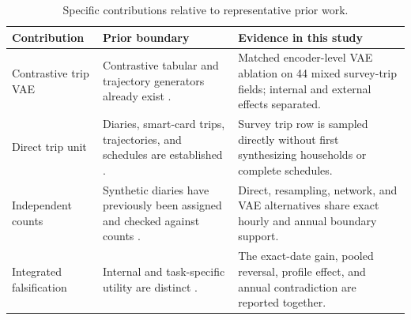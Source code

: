 \begin{table}[!htbp]
\caption{Specific contributions relative to representative prior work.}
\label{tab:contributions}
\centering
\setlength{\tabcolsep}{3.2pt}
\begin{tabularx}{\textwidth}{P{0.22\textwidth} P{0.34\textwidth}Y}
\toprule
\textbf{Contribution} & \textbf{Prior boundary} & \textbf{Evidence in this study} \\
\midrule
Contrastive trip VAE & Contrastive tabular and trajectory generators already exist \citep{lee2023codi,li2026syncmove}. & Matched encoder-level VAE ablation on 44 mixed survey-trip fields; internal and external effects separated. \\
Direct trip unit & Diaries, smart-card trips, trajectories, and schedules are established \citep{greaves2000survey,kieu2023smartcard,lee2025collagan}. & Survey trip row is sampled directly without first synthesizing households or complete schedules. \\
Independent counts & Synthetic diaries have previously been assigned and checked against counts \citep{kressner2017nchrp}. & Direct, resampling, network, and VAE alternatives share exact hourly and annual boundary support. \\
Integrated falsification & Internal and task-specific utility are distinct \citep{snoke2018utility,wu2026evaluation}. & The exact-date gain, pooled reversal, profile effect, and annual contradiction are reported together. \\
\bottomrule
\end{tabularx}
\end{table}
